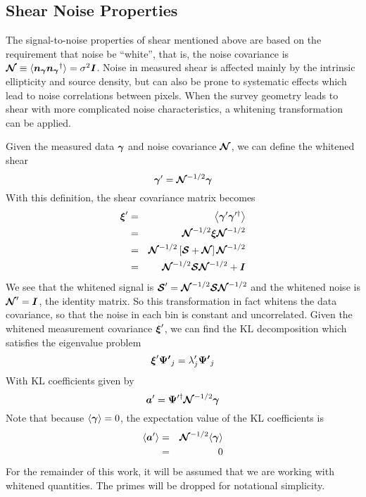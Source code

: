 \subsection{Shear Noise Properties}
\label{sec:whitening}
The signal-to-noise properties of shear mentioned above are based on the 
requirement that noise be ``white'', that is, the noise covariance is
$\boldsymbol{\mathcal{N}} \equiv 
\langle\boldsymbol{n_\gamma}\boldsymbol{n_\gamma}^\dagger\rangle
= \sigma^2 \boldsymbol{I}$.  Noise in measured shear is affected mainly by the
intrinsic ellipticity and source density, but can also be prone to systematic
effects which lead to noise correlations between pixels.  When the survey
geometry leads to shear with more complicated noise characteristics, a
whitening transformation can be applied.

Given the measured data $\boldsymbol{\gamma}$ and noise covariance
$\boldsymbol{\mathcal{N}}$, we can define the whitened shear
\begin{equation}
  \boldsymbol{\gamma}^\prime = \boldsymbol{\mathcal{N}}^{-1/2} \boldsymbol{\gamma}
\end{equation}
With this definition, the shear covariance matrix becomes
\begin{eqnarray}
  \boldsymbol{\xi}^\prime 
  &=& \left\langle \boldsymbol{\gamma}^\prime 
  \boldsymbol{\gamma}^{\prime\dagger}\right\rangle \nonumber\\
  &=& \boldsymbol{\mathcal{N}}^{-1/2}\boldsymbol{\xi}
  \boldsymbol{\mathcal{N}}^{-1/2} \nonumber\\
  &=& \boldsymbol{\mathcal{N}}^{-1/2}\left[
    \boldsymbol{\mathcal{S}} + \boldsymbol{\mathcal{N}}
    \right]\boldsymbol{\mathcal{N}}^{-1/2} \nonumber\\
  &=& \boldsymbol{\mathcal{N}}^{-1/2}\boldsymbol{\mathcal{S}}\boldsymbol{\mathcal{N}}^{-1/2} + \boldsymbol{I}
\end{eqnarray}
We see that the whitened signal is $\boldsymbol{\mathcal{S}}^\prime = 
\boldsymbol{\mathcal{N}}^{-1/2}\boldsymbol{\mathcal{S}}\boldsymbol{\mathcal{N}}^{-1/2}$
and the whitened noise is $\boldsymbol{\mathcal{N}}^\prime = \boldsymbol{I}$, the
identity matrix. So this transformation in fact whitens the data covariance,
so that the noise in each bin is constant and uncorrelated.  Given the
whitened measurement covariance $\boldsymbol{\xi}^\prime$, we can find the KL
decomposition which satisfies the eigenvalue problem
\begin{equation}
  \boldsymbol{\xi}^\prime \boldsymbol{\Psi^\prime}_j = 
  \lambda^\prime_j \boldsymbol{\Psi^\prime}_j
\end{equation}
With KL coefficients given by
\begin{equation}
  \boldsymbol{a}^\prime = \boldsymbol{\Psi}^{\prime\dagger}
  \boldsymbol{\mathcal{N}}^{-1/2}\boldsymbol{\gamma}
\end{equation}
Note that because $\langle\boldsymbol{\gamma}\rangle = 0$,
the expectation value of the KL coefficients is
\begin{eqnarray}
  \langle\boldsymbol{a}^\prime\rangle 
  &=& \boldsymbol{\mathcal{N}}^{-1/2}\langle\boldsymbol{\gamma}\rangle\nonumber\\
  &=& 0
\end{eqnarray}
For the remainder of this work, it will be assumed that we are working with
whitened quantities.  The primes will be dropped for notational simplicity.

